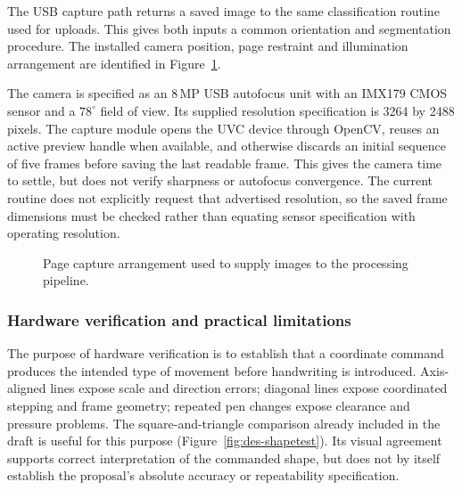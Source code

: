 The USB capture path returns a saved image to the same classification routine used for uploads. This gives both inputs a common orientation and segmentation procedure. The installed camera position, page restraint and illumination arrangement are identified in Figure~\ref{fig:des-capture}.

The camera is specified as an 8\,MP USB autofocus unit with an IMX179 CMOS sensor and a $78^\circ$ field of view. Its supplied resolution specification is 3264 by 2488 pixels. The capture module opens the UVC device through OpenCV, reuses an active preview handle when available, and otherwise discards an initial sequence of five frames before saving the last readable frame. This gives the camera time to settle, but does not verify sharpness or autofocus convergence. The current routine does not explicitly request that advertised resolution, so the saved frame dimensions must be checked rather than equating sensor specification with operating resolution.


\begin{figure}[!htbp]\centering
{}
\caption{Page capture arrangement used to supply images to the processing pipeline.}
\label{fig:des-capture}
\end{figure}


\subsubsection{Hardware verification and practical limitations}
The purpose of hardware verification is to establish that a coordinate command produces the intended type of movement before handwriting is introduced. Axis-aligned lines expose scale and direction errors; diagonal lines expose coordinated stepping and frame geometry; repeated pen changes expose clearance and pressure problems. The square-and-triangle comparison already included in the draft is useful for this purpose (Figure~\ref{fig:des-shapetest}). Its visual agreement supports correct interpretation of the commanded shape, but does not by itself establish the proposal's absolute accuracy or repeatability specification.

